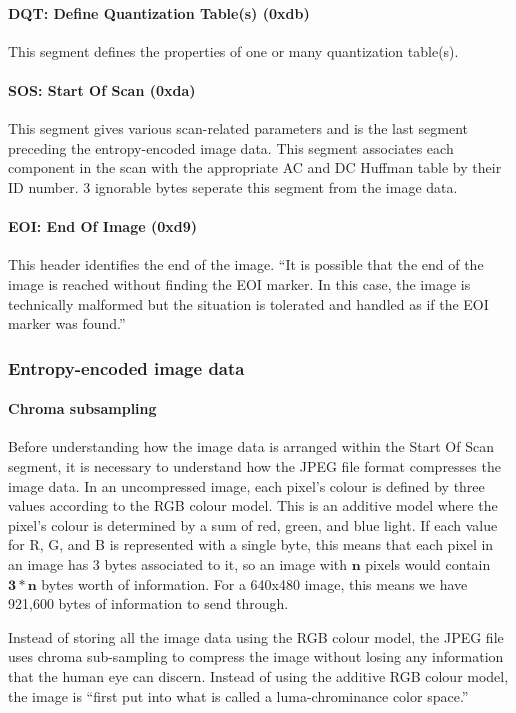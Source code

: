 \paragraph*{DQT: Define Quantization Table(s) (0xdb)}
This segment defines the properties of one or many quantization table(s).

\paragraph*{SOS: Start Of Scan (0xda)}
This segment gives various scan-related parameters and is the last segment preceding the entropy-encoded image data. 
This segment associates each component in the scan with the appropriate AC and DC Huffman table by their ID number. 
3 ignorable bytes seperate this segment from the image data. 

\paragraph*{EOI: End Of Image (0xd9)}
This header identifies the end of the image. ``It is possible that the end of the image is reached without finding the EOI marker. 
In this case, the image is technically malformed but the situation is tolerated and handled as if the EOI marker was found.'' \cite{winzip_jpeg_compression}

\subsubsection{Entropy-encoded image data}

\paragraph{Chroma subsampling}
Before understanding how the image data is arranged within the Start Of Scan segment, 
it is necessary to understand how the JPEG file format compresses the image data. 
In an uncompressed image, each pixel's colour is defined by three values according to the RGB colour model. 
This is an additive model where the pixel's colour is determined by a sum of red, green, and blue light. 
If each value for R, G, and B is represented with a single byte, this means that each pixel in an image has 3 bytes associated to it, so 
an image with $\mathbf{n}$ pixels would contain $\mathbf{3*n}$ bytes worth of information. 
For a 640x480 image, this means we have 921,600 bytes of information to send through.

Instead of storing all the image data using the RGB colour model, 
the JPEG file uses chroma sub-sampling to compress the image without losing any information that the human eye can discern. 
Instead of using the additive RGB colour model, the image is ``first put into what is called a luma-chrominance color space.'' \cite{kerr_chroma_subsampling}


